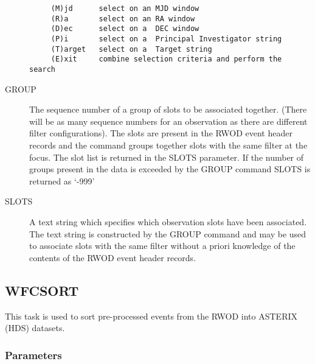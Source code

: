 \begin{description}
\begin{verbatim}
     (M)jd      select on an MJD window
     (R)a       select on an RA window
     (D)ec      select on a  DEC window
     (P)i       select on a  Principal Investigator string
     (T)arget   select on a  Target string
     (E)xit     combine selection criteria and perform the search
\end{verbatim}

\item[GROUP  ]
The sequence number of a group of slots to be associated together.
(There will be as many sequence numbers for an observation as there are
different filter configurations). The slots are present in the RWOD
event header records and the command groups together slots with the
same filter at the focus. The slot list is returned in the SLOTS
parameter. If the number of groups present in the data is exceeded by
the GROUP command SLOTS is returned as `-999'

\item[SLOTS  ]
A text string which specifies which observation slots have been
associated. The text string is constructed by the GROUP command and may
be used to associate slots with the same filter without a priori
knowledge of the contents of the RWOD event header records.

\end{description}

\subsection{WFCSORT}
\label{sec:programs:wfcsort}

This task is used to sort pre-processed events from the RWOD into 
ASTERIX (HDS) datasets.

\subsubsection{Parameters}

